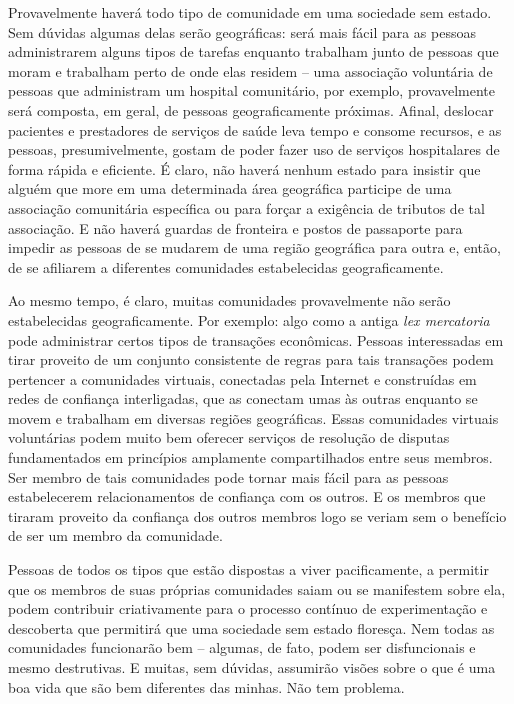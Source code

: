 Provavelmente haverá todo tipo de comunidade em uma sociedade sem estado. Sem dúvidas algumas delas serão geográficas: será mais fácil para as pessoas administrarem alguns tipos de tarefas enquanto trabalham junto de pessoas que moram e trabalham perto de onde elas residem -- uma associação voluntária de pessoas que administram um hospital comunitário, por exemplo, provavelmente será composta, em geral, de pessoas geograficamente próximas. Afinal, deslocar pacientes e prestadores de serviços de saúde leva tempo e consome recursos, e as pessoas, presumivelmente, gostam de poder fazer uso de serviços hospitalares de forma rápida e eficiente. É claro, não haverá nenhum estado para insistir que alguém que more em uma determinada área geográfica participe de uma associação comunitária específica ou para forçar a exigência de tributos de tal associação. E não haverá guardas de fronteira e postos de passaporte para impedir as pessoas de se mudarem de uma região geográfica para outra e, então, de se afiliarem a diferentes comunidades estabelecidas geograficamente.

Ao mesmo tempo, é claro, muitas comunidades provavelmente não serão estabelecidas geograficamente. Por exemplo: algo como a antiga \emph{lex mercatoria} pode administrar certos tipos de transações econômicas. Pessoas interessadas em tirar proveito de um conjunto consistente de regras para tais transações podem pertencer a comunidades virtuais, conectadas pela Internet e construídas em redes de confiança interligadas, que as conectam umas às outras enquanto se movem e trabalham em diversas regiões geográficas. Essas comunidades virtuais voluntárias podem muito bem oferecer serviços de resolução de disputas fundamentados em princípios amplamente compartilhados entre seus membros. Ser membro de tais comunidades pode tornar mais fácil para as pessoas estabelecerem relacionamentos de confiança com os outros. E os membros que tiraram proveito da confiança dos outros membros logo se veriam sem o benefício de ser um membro da comunidade.

Pessoas de todos os tipos que estão dispostas a viver pacificamente, a permitir que os membros de suas próprias comunidades saiam ou se manifestem sobre ela, podem contribuir criativamente para o processo contínuo de experimentação e descoberta que permitirá que uma sociedade sem estado floresça. Nem todas as comunidades funcionarão bem -- algumas, de fato, podem ser disfuncionais e mesmo destrutivas. E muitas, sem dúvidas, assumirão visões sobre o que é uma boa vida que são bem diferentes das minhas. Não tem problema. 

